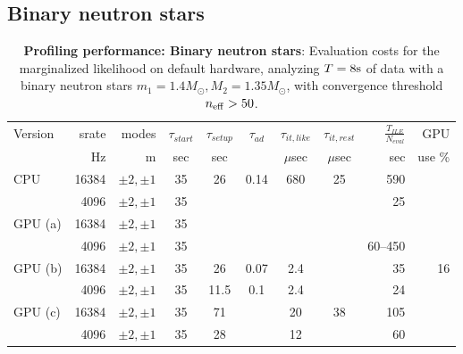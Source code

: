 \documentclass[twocolumn,prd,nofootinbib]{revtex4}
\newcommand\unit[1]{{\rm #1}}
\begin{document}
\subsection{Binary neutron stars}
\begin{table}
\begin{tabular}{lrr|ccccc|rr}
Version & srate & modes & $\tau_{start}$ & $\tau_{setup}$ & $\tau_{ad}$ & $\tau_{it,like}$ &$\tau_{it,rest}$ &
$\frac{T_{ILE}}{N_{eval}}$ & GPU \\  %
  &   Hz & m & sec & sec & & $\mu$sec & $\mu$sec  &sec  & use  \%\\ \hline 
CPU & 16384 & $\pm 2,\pm 1 $ & 35 & 26 & 0.14  & 680  & 25 & 590     \\ 
       & 4096 & $\pm 2, \pm 1$ & 35 & &  &   &&  25 &  \\ \hline
GPU (a) & 16384 & $\pm 2, \pm 1$   & 35 &  &&&  &    \\
       & 4096 & $ \pm 2, \pm 1 $        &  35  & &&&& 60--450  \\ \hline
GPU (b) & 16384 & $\pm 2, \pm 1$   & 35 & 26 & 0.07 &  2.4 & &35 & 16 \\
       & 4096 & $ \pm 2, \pm 1 $        &  35  & 11.5 & 0.1 &  2.4  & &24 &  \\ \hline
GPU (c) & 16384 & $\pm 2, \pm 1$   & 35 & 71 &&20 & 38 &  105   \\
       & 4096 & $ \pm 2, \pm 1 $        &  35  & 28 && 12 && 60  \\ \hline
\end{tabular}
\caption{\label{tab:CostBreakdown:BNS}\textbf{Profiling performance: Binary neutron stars}: Evaluation costs for the
  marginalized likelihood on default
  hardware,  analyzing $T=8\unit{s}$ of data with a binary neutron stars
  $m_1=1.4 M_\odot,M_2=1.35 M_\odot$, with convergence threshold $n_{\rm eff} > 50$.
}
\end{table}
\end{document}
